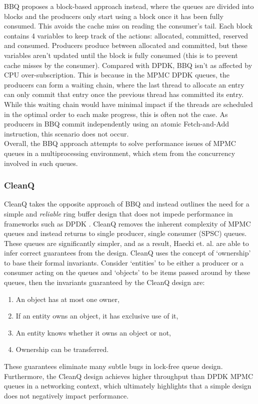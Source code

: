 BBQ proposes a block-based approach instead, where the queues are divided into blocks and the producers only
start using a block once it has been fully consumed. This avoids the cache miss on 
reading the consumer's tail. Each block contains 4 variables to keep track of the actions: allocated,
committed, reserved and consumed. Producers produce between allocated and committed, but these variables 
aren’t updated until the block is fully consumed (this is to prevent cache misses by the consumer).
Compared with DPDK, BBQ isn't as affected by CPU over-subscription. This is because in the MPMC
DPDK queues, the producers can form a waiting chain, where the last thread to allocate an entry can only 
commit that entry once the previous thread has committed its entry. While this waiting chain would have 
minimal impact if the threads are scheduled in the optimal order to each make progress, this is often not 
the case. As producers in BBQ commit independently using an atomic Fetch-and-Add 
instruction, this scenario does not occur.\\
Overall, the BBQ approach attempts to solve performance issues of MPMC queues in a multiprocessing environment,
which stem from the concurrency involved in such queues. 

\subsubsection{CleanQ}
CleanQ takes the opposite approach of BBQ and instead outlines the need for a simple and \emph{reliable} ring buffer
design that does not impede performance in frameworks such as DPDK \cite{Haecki_HACSR_19}. CleanQ removes
the inherent complexity of MPMC queues and instead returns to single producer, single consumer (SPSC)
queues. These queues are significantly simpler, and as a result, Haecki et. al. are able to infer
correct guarantees from the design. CleanQ uses the concept of `ownership' to base their formal invariants. 
Consider `entities' to be either a producer or a consumer acting on the queues and `objects' to be items passed around
by these queues, then the invariants guaranteed by the CleanQ design are:
\begin{enumerate}
\item An object has at most one owner,
\item If an entity owns an object, it has exclusive use of it,
\item An entity knows whether it owns an object or not,
\item Ownership can be transferred.
\end{enumerate}
These guarantees eliminate many subtle bugs in lock-free queue design.
Furthermore, the CleanQ design achieves higher throughput than DPDK MPMC queues in a networking
context, which ultimately highlights that a simple design does not negatively impact performance.

